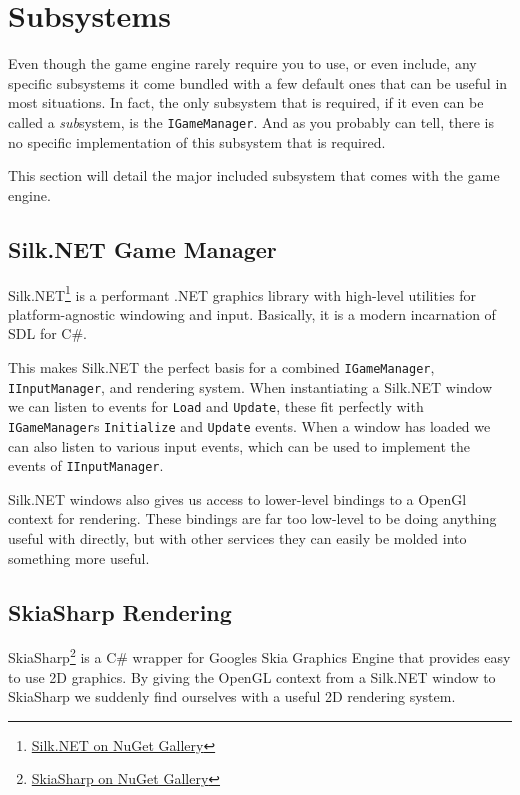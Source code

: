 \documentclass{article}
\newcommand{\zarya}{the game engine}
\begin{document}
\section*{Subsystems}

Even though \zarya{} rarely require you to use, or even include, any specific subsystems it come bundled with a few default ones that can be useful in most situations.
In fact, the only subsystem that is required, if it even can be called a \emph{sub}system, is the \texttt{IGameManager}.
And as you probably can tell, there is no specific implementation of this subsystem that is required.

This section will detail the major included subsystem that comes with \zarya{}.

\subsection*{Silk.NET Game Manager}

Silk.NET\footnote{\href{https://www.nuget.org/packages/Silk.NET}{Silk.NET on NuGet Gallery}} is a performant .NET graphics library with high-level utilities for platform-agnostic windowing and input.
Basically, it is a modern incarnation of SDL for C\#.

\sloppy This makes Silk.NET the perfect basis for a combined \texttt{IGameManager}, \texttt{IInputManager}, and rendering system.
When instantiating a Silk.NET window we can listen to events for \texttt{Load} and \texttt{Update}, these fit perfectly with \texttt{IGameManager}s \texttt{Initialize} and \texttt{Update} events.
When a window has loaded we can also listen to various input events, which can be used to implement the events of \texttt{IInputManager}.

Silk.NET windows also gives us access to lower-level bindings to a OpenGl context for rendering.
These bindings are far too low-level to be doing anything useful with directly, but with other services they can easily be molded into something more useful.

\subsection*{SkiaSharp Rendering}

SkiaSharp\footnote{\href{https://www.nuget.org/packages/SkiaSharp}{SkiaSharp on NuGet Gallery}} is a C\# wrapper for Googles Skia Graphics Engine that provides easy to use 2D graphics.
By giving the OpenGL context from a Silk.NET window to SkiaSharp we suddenly find ourselves with a useful 2D rendering system.
\end{document}
